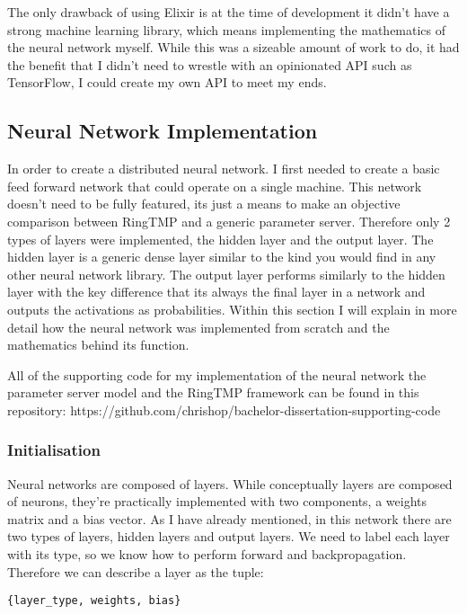 The only drawback of using Elixir is at the time of development it didn't have a
strong machine learning library, which means implementing the mathematics of the
neural network myself. While this was a sizeable amount of work to do, it had
the benefit that I didn't need to wrestle with an opinionated API such as TensorFlow,
I could create my own API to meet my ends.

\subsection{Neural Network Implementation}
In order to create a distributed neural network. I first needed to create a
basic feed forward network that could operate on a single machine. This network
doesn't need to be fully featured, its just a means to make an objective
comparison between RingTMP and a generic parameter server. Therefore only 2
types of layers were implemented, the hidden layer and the output layer. The
hidden layer is a generic dense layer similar to the kind you would find in any
other neural network library. The output layer performs similarly to the hidden
layer with the key difference that its always the final layer in a network and
outputs the activations as probabilities. Within this section I will explain in
more detail how the neural network was implemented from scratch and the
mathematics behind its function.

All of the supporting code for my implementation of the neural network the
parameter server model and the RingTMP framework can be found in this
repository: https://github.com/chrishop/bachelor-dissertation-supporting-code

\subsubsection{Initialisation}
Neural networks are composed of layers. While conceptually layers are
composed of neurons, they're practically implemented with two components, a
weights matrix and a bias vector. As I have already mentioned, in this network
there are two types of layers, hidden layers and output layers. We need to label
each layer with its type, so we know how to perform forward and
backpropagation. Therefore we can describe a layer as the tuple:
\begin{lstlisting}[numbers=none,frame=none]
    {layer_type, weights, bias}
\end{lstlisting}

